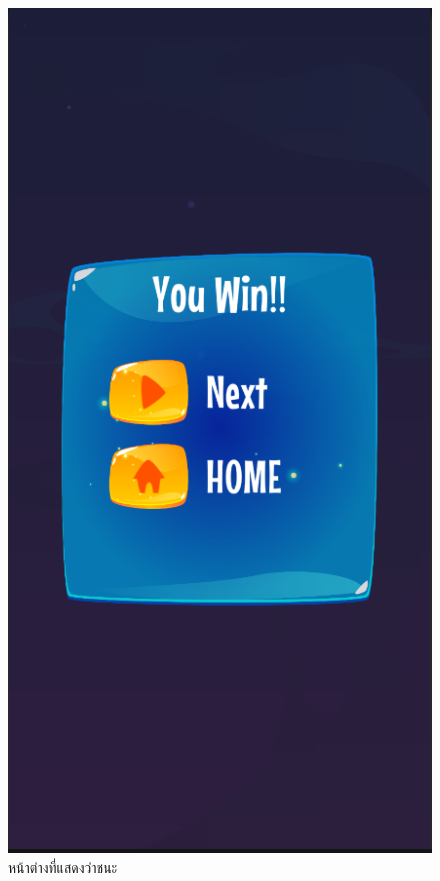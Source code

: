 \begin{figure}
\begin{center}
\includegraphics[scale = 0.4]{pic/win.PNG}
\end{center}
\caption[Poem]{หน้าต่างที่แสดงว่าชนะ}
\label{win}
\end{figure}

